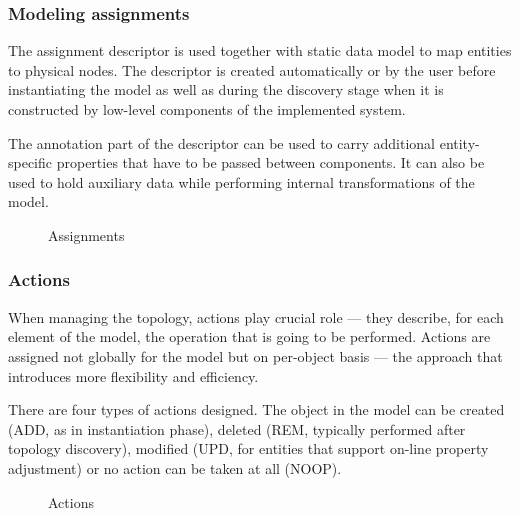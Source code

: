 \documentclass[11pt]{book}
\begin{document}
        \subsubsection{Modeling assignments}

          The assignment descriptor is used together with static data model to map entities to physical nodes. The
          descriptor is created automatically or by the user before instantiating the model as well as during the
          discovery stage when it is constructed by low-level components of the implemented system.

          The annotation part of the descriptor can be used to carry additional entity-specific properties that have to
          be passed between components. It can also be used to hold auxiliary data while performing internal
          transformations of the model.

          \begin{figure}[H]
            \centering

          
            \caption{Assignments}
          \end{figure}


        \subsubsection{Actions}

          When managing the topology, actions play crucial role --- they describe, for each element of the model, the
          operation that is going to be performed. Actions are assigned not globally for the model but on per-object
          basis --- the approach that introduces more flexibility and efficiency.

          There are four types of actions designed. The object in the model can be created (ADD, as in instantiation
          phase), deleted (REM, typically performed after topology discovery), modified (UPD, for entities that support
          on-line property adjustment) or no action can be taken at all (NOOP).

          \begin{figure}[H]
            \centering

          
            \caption{Actions}
          \end{figure}
\end{document}
